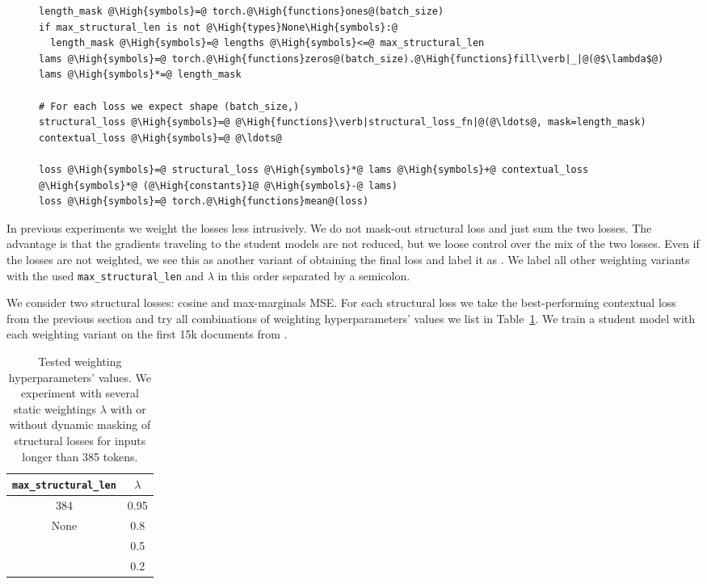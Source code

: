 \begin{figure}
\begin{lstlisting}[caption=Python-like pseudocode of weighting algorithm.,label={lst:weighting}]
length_mask @\High{symbols}=@ torch.@\High{functions}ones@(batch_size)
if max_structural_len is not @\High{types}None\High{symbols}:@
  length_mask @\High{symbols}=@ lengths @\High{symbols}<=@ max_structural_len
lams @\High{symbols}=@ torch.@\High{functions}zeros@(batch_size).@\High{functions}fill\verb|_|@(@$\lambda$@)
lams @\High{symbols}*=@ length_mask

# For each loss we expect shape (batch_size,)
structural_loss @\High{symbols}=@ @\High{functions}\verb|structural_loss_fn|@(@\ldots@, mask=length_mask)
contextual_loss @\High{symbols}=@ @\ldots@

loss @\High{symbols}=@ structural_loss @\High{symbols}*@ lams @\High{symbols}+@ contextual_loss @\High{symbols}*@ (@\High{constants}1@ @\High{symbols}-@ lams)
loss @\High{symbols}=@ torch.@\High{functions}mean@(loss)
\end{lstlisting}
\end{figure}

In previous experiments we weight the losses less intrusively. We do not
mask-out structural loss and just sum the two losses. The advantage
is that the gradients traveling to the student models are not reduced, but we
loose control over the mix of the two losses. Even if the losses are not
weighted, we see this as another variant of obtaining the final loss and label
it as . We label all other weighting variants with the used
\texttt{max\_structural\_len} and $\lambda$ in this order separated by a
semicolon.

We consider two structural losses: cosine and max-marginals MSE. For each
structural loss we take the best-performing contextual loss from the previous
section and try all combinations of weighting hyperparameters' values we list
in Table~\ref{table:weighting_variants}. We train a student model with each
weighting variant on the first 15k documents from .

\begin{table}
  \centering
  \footnotesize
  \begin{tabular}{cc}
    \toprule
    \texttt{max\_structural\_len} & $\lambda$ \\
    \midrule
    384 & 0.95 \\
    None & 0.8 \\
    & 0.5 \\
    & 0.2 \\
    \bottomrule
  \end{tabular}

  \caption{Tested weighting hyperparameters' values. We experiment with several
  static weightings $\lambda$ with or without dynamic masking of structural
  losses for inputs longer than 385 tokens.}

  \label{table:weighting_variants}

\end{table}

